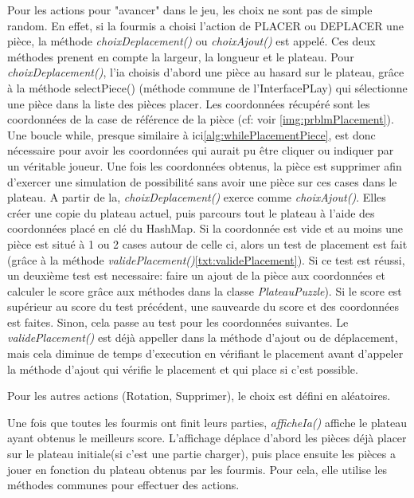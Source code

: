         Pour les actions pour "avancer" dans le jeu, les choix ne sont pas de simple random. En effet, si la fourmis a choisi l'action de PLACER ou DEPLACER une pièce, la méthode \textit{choixDeplacement()} ou \textit{choixAjout()} est appelé. Ces deux méthodes prenent en compte la largeur, la longueur et le plateau.
        Pour \textit{choixDeplacement()}, l'ia choisis d'abord une pièce au hasard sur le plateau, grâce à la méthode selectPiece() (méthode commune de l'InterfacePLay) qui sélectionne une pièce dans la liste des pièces placer. Les coordonnées récupéré sont les coordonnées de la case de référence de la pièce (cf: voir \ref{img:prblmPlacement}). Une boucle while, presque similaire  à ici\ref{alg:whilePlacementPiece}, est donc nécessaire pour avoir les coordonnées qui aurait pu être cliquer ou indiquer par un véritable joueur. Une fois les coordonnées obtenus, la pièce est supprimer afin d'exercer une simulation de possibilité sans avoir une pièce sur ces cases dans le plateau.
        A partir de la, \textit{choixDeplacement()} exerce comme \textit{choixAjout()}. Elles créer une copie du plateau actuel, puis parcours tout le plateau à l'aide des coordonnées placé en clé du HashMap. Si la coordonnée est vide et au moins une pièce est situé à 1 ou 2 cases autour de celle ci, alors un test de placement est fait (grâce à la méthode \textit{validePlacement()}\ref{txt:validePlacement}). Si ce test est réussi, un deuxième test est necessaire: faire un ajout de la pièce aux coordonnées et calculer le score grâce aux méthodes dans la classe \textit{PlateauPuzzle}). Si le score est supérieur au score du test précédent, une sauvearde du score et des coordonnées est faites. Sinon, cela passe au test pour les coordonnées suivantes.
        Le \textit{validePlacement()} est déjà appeller dans la méthode d'ajout ou de déplacement, mais cela diminue de temps d'execution en vérifiant le placement avant d'appeler la méthode d'ajout qui vérifie le placement et qui place si c'est possible.

        Pour les autres actions (Rotation, Supprimer), le choix est défini en aléatoires.

        Une fois que toutes les fourmis ont finit leurs parties, \textit{afficheIa()} affiche le plateau ayant obtenus le meilleurs score. L'affichage déplace d'abord les pièces déjà placer sur le plateau initiale(si c'est une partie charger), puis place ensuite les pièces a jouer en fonction du plateau obtenus par les fourmis. Pour cela, elle utilise les méthodes communes pour effectuer des actions.

